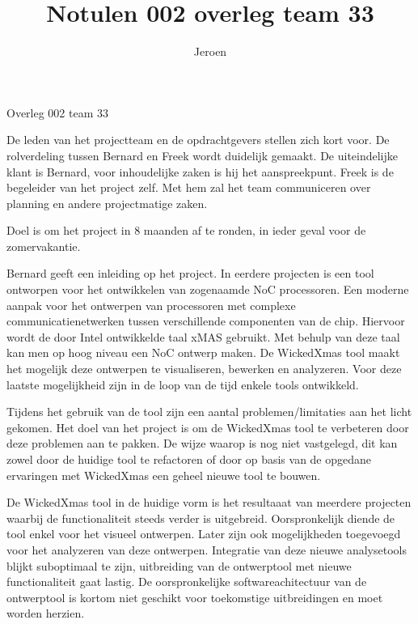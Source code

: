 \documentclass{article}
\title{Notulen 002 overleg team 33}
\author{Jeroen}
\begin{document}

\begin{Minutes}{Overleg 002 team 33}

\maketitle%


De leden van het projectteam en de opdrachtgevers stellen zich kort voor. De rolverdeling tussen Bernard en
Freek wordt duidelijk gemaakt. De uiteindelijke klant is Bernard, voor inhoudelijke zaken is hij het aanspreekpunt.
Freek is de begeleider van het project zelf. Met hem zal het team communiceren over planning en andere projectmatige zaken.

Doel is om het project in 8 maanden af te ronden, in ieder geval voor de zomervakantie.


Bernard geeft een inleiding op het project. In eerdere projecten is een tool ontworpen voor het ontwikkelen van zogenaamde
NoC processoren. Een moderne aanpak voor het ontwerpen van processoren met complexe communicatienetwerken tussen verschillende
componenten van de chip. Hiervoor wordt de door Intel ontwikkelde taal xMAS gebruikt. Met behulp van deze taal kan men op
hoog niveau een NoC ontwerp maken. De WickedXmas tool maakt het mogelijk deze ontwerpen te visualiseren, bewerken en analyzeren.
Voor deze laatste mogelijkheid zijn in de loop van de tijd enkele tools ontwikkeld.

Tijdens het gebruik van de tool zijn een aantal problemen/limitaties aan het licht gekomen. Het doel van het project is om
de WickedXmas tool te verbeteren door deze problemen aan te pakken. De wijze waarop is nog niet vastgelegd, dit kan zowel door
de huidige tool te refactoren of door op basis van de opgedane ervaringen met WickedXmas een geheel nieuwe tool te bouwen.

De WickedXmas tool in de huidige vorm is het resultaaat van meerdere projecten waarbij de functionaliteit steeds verder is
uitgebreid. Oorspronkelijk diende de tool enkel voor het visueel ontwerpen. Later zijn ook mogelijkheden toegevoegd voor het
analyzeren van deze ontwerpen. Integratie van deze nieuwe analysetools blijkt suboptimaal te zijn, uitbreiding van de ontwerptool
met nieuwe functionaliteit gaat lastig. De oorspronkelijke softwareachitectuur van de ontwerptool is kortom niet geschikt voor
toekomstige uitbreidingen en moet worden herzien.


\end{Minutes}
\end{document}
